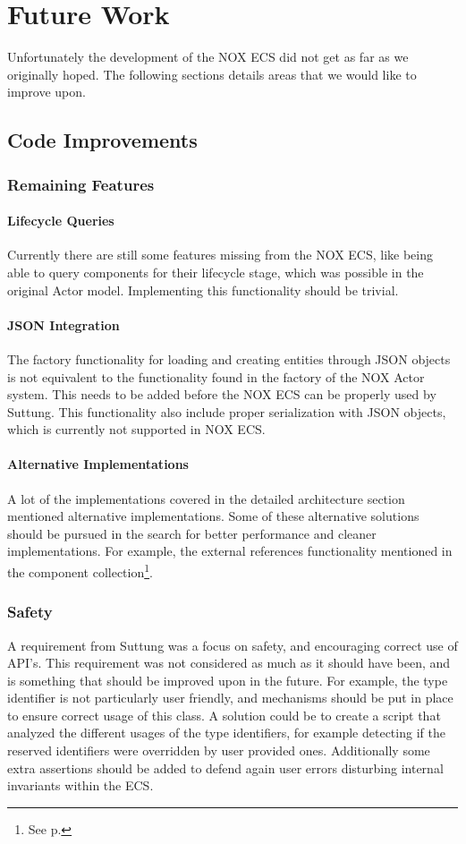 \chapter{Future Work}
\label{chap:future_work}
Unfortunately the development of the NOX ECS did not get as far as we originally hoped.
The following sections details areas that we would like to improve upon.

\section{Code Improvements}
\subsection{Remaining Features}
\subsubsection{Lifecycle Queries}
Currently there are still some features missing from the NOX ECS, like being able to query
components for their lifecycle stage, which was possible in the original Actor model.
Implementing this functionality should be trivial.

\subsubsection{JSON Integration}
The factory functionality for loading and creating entities through JSON objects
is not equivalent to the functionality found in the factory of the NOX Actor system.
This needs to be added before the NOX ECS can be properly used by Suttung.
This functionality also include proper serialization with JSON objects, which
is currently not supported in NOX ECS.

\subsubsection{Alternative Implementations}
A lot of the implementations covered in the detailed architecture section mentioned alternative
implementations. Some of these alternative solutions should be pursued in the search for
better performance and cleaner implementations. For example, the external references functionality
mentioned in the component collection\footnote{See p.\pageref{subpar:detailed_component_collection_external_references}}.

\subsection{Safety}
A requirement from Suttung was a focus on safety, and encouraging correct use of API's.
This requirement was not considered as much as it should have been, and is something that
should be improved upon in the future.
For example, the type identifier is not particularly user friendly, and mechanisms should
be put in place to ensure correct usage of this class.
A solution could be to create a script that analyzed the different usages of the type identifiers,
for example detecting if the reserved identifiers were overridden by user provided ones.
Additionally some extra assertions should be added to defend again user errors disturbing internal
invariants within the ECS.

